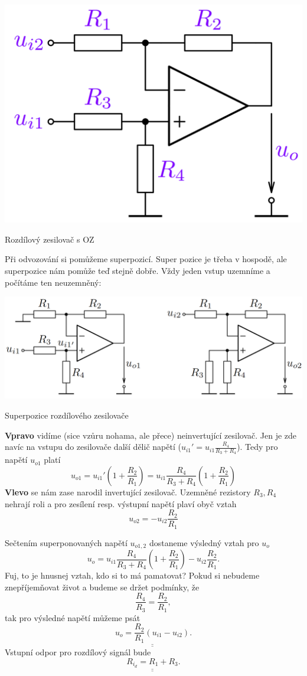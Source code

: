 \documentclass[a4paper,12pt]{article}   %
\begin{document}
\begin{schema}[h!]
    \centering
    \includegraphics[width=.4\textwidth]{rozdilovy-zesilovac-oz.PNG}
    \caption{Rozdílový zesilovač s OZ}
    \label{sch:rozdilovy:zesilovac}
\end{schema}

Při odvozování si pomůžeme superpozicí. Super pozice je třeba v hospodě, ale superpozice nám pomůže teď stejně dobře. Vždy jeden vstup uzemníme a počítáme ten neuzemněný:
\begin{schema}[h!]
    \centering
    \includegraphics[height=.25\linewidth]{rozdilovy-zesilovac-oz-superpozice.PNG}
    \caption{Superpozice rozdílového zesilovače}
\end{schema}
\textbf{Vpravo} vidíme (sice vzůru nohama, ale přece) neinvertující zesilovač. Jen je zde navíc na vstupu do zesilovače další dělič napětí ($u_{i1}' = u_{i1}\frac{R_4}{R_3 + R_4}$). Tedy pro napětí $u_{o1}$ platí 
\begin{equation*}
    u_{o1} = u_{i1}'\left(1+\frac{R_2}{R_1}\right) = u_{i1}\frac{R_4}{R_3+R_4}\left(1+\frac{R_2}{R_1}\right)
\end{equation*}
\textbf{Vlevo} se nám zase narodil invertující zesilovač. Uzemněné rezistory $R_3, R_4$ nehrají roli a pro zesílení resp. výstupní napětí plaví obyč vztah
\begin{equation*}
    u_{o2} = -u_{i2}\frac{R_2}{R_1}
\end{equation*}

Sečtením superponovaných napětí $u_{o1,2}$ dostaneme výsledný vztah pro $u_o$
\begin{equation}
    u_o = u_{i1}\frac{R_4}{R_3+R_4}\left(1+\frac{R_2}{R_1}\right)-u_{i2}\frac{R_2}{R_1}.
\end{equation}
Fuj, to je hnusnej vztah, kdo si to má pamatovat? Pokud si nebudeme znepříjemňovat život a budeme se držet podmínky, že
\begin{equation*}
    \frac{R_4}{R_3} = \frac{R_2}{R_1},
\end{equation*}
tak pro výsledné napětí můžeme psát
\begin{equation}
    \underline{\underline{u_o = \frac{R_2}{R_1}(u_{i1}-u_{i2})}}.
\end{equation}
Vstupní odpor pro rozdílový signál bude
\begin{equation}
    \underline{\underline{R_{i_d} = R_1 + R_3}}.
\end{equation}
\end{document}
